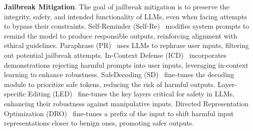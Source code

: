 \noindent\textbf{Jailbreak Mitigation}. 
The goal of jailbreak mitigation is to preserve the integrity, safety, and intended functionality of LLMs, even when facing attempts to bypass their constraints. Self-Reminder (Self-Re)~\cite{self-reminder} modifies system prompts to remind the model to produce responsible outputs, reinforcing alignment with ethical guidelines. Paraphrase (PR)~\cite{Paraphrase} uses LLMs to rephrase user inputs, filtering out potential jailbreak attempts. In-Context Defense (ICD)~\cite{icd} incorporates demonstrations rejecting harmful prompts into user inputs, leveraging in-context learning to enhance robustness. SafeDecoding (SD)~\cite{safedecoding} fine-tunes the decoding module to prioritize safe tokens, reducing the risk of harmful outputs. Layer-specific Editing (LED)~\cite{led} fine-tunes the key layers critical for safety in LLMs, enhancing their robustness against manipulative inputs. Directed Representation Optimization (DRO)~\cite{dro} fine-tunes a prefix of the input to shift harmful input representations closer to benign ones, promoting safer outputs.